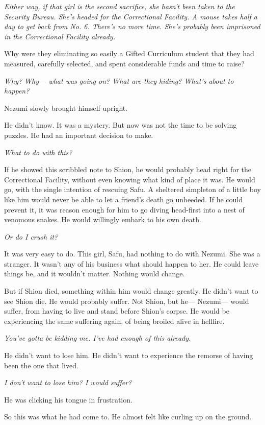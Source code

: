 \emph{Either way, if that girl is the second sacrifice, she hasn't been taken
to the Security Bureau. She's headed for the Correctional Facility. A
mouse takes half a day to get back from No. 6. There's no more time.
She's probably been imprisoned in the Correctional Facility already.}

Why were they eliminating so easily a Gifted Curriculum student that
they had measured, carefully selected, and spent considerable funds and
time to raise?

\emph{Why? Why--- what was going on? What are they hiding? What's about to
happen?}

Nezumi slowly brought himself upright.

He didn't know. It was a mystery. But now was not the time to be solving
puzzles. He had an important decision to make.

\emph{What to do with this?}

If he showed this scribbled note to Shion, he would probably head right
for the Correctional Facility, without even knowing what kind of place
it was. He would go, with the single intention of rescuing Safu. A
sheltered simpleton of a little boy like him would never be able to let
a friend's death go unheeded. If he could prevent it, it was reason
enough for him to go diving head-first into a nest of venomous snakes.
He would willingly embark to his own death.

\emph{Or do I crush it?}

It was very easy to do. This girl, Safu, had nothing to do with Nezumi.
She was a stranger. It wasn't any of his business what should happen to
her. He could leave things be, and it wouldn't matter. Nothing would
change.

But if Shion died, something within him would change greatly. He didn't
want to see Shion die. He would probably suffer. Not Shion, but he---
Nezumi--- would suffer, from having to live and stand before Shion's
corpse. He would be experiencing the same suffering again, of being
broiled alive in hellfire.

\emph{You've gotta be kidding me. I've had enough of this already.}

He didn't want to lose him. He didn't want to experience the remorse of
having been the one that lived.

\emph{I don't want to lose him? I would suffer?}

He was clicking his tongue in frustration.

So this was what he had come to. He almost felt like curling up on the
ground.

